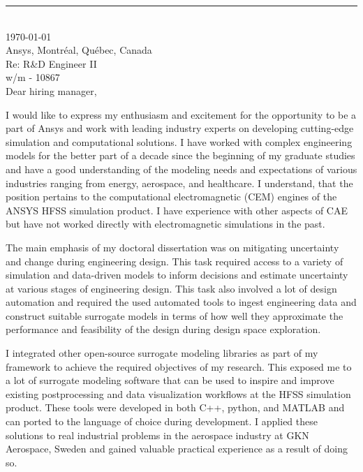 \documentclass[12pt]{article} %
\begin{document}
\medskip %
\rule[0pt]{\textwidth}{1pt}\\
\today\\[6pt]
Ansys, Montr\'{e}al, Qu\'{e}bec, Canada\\
Re: R\&D Engineer II\\
w/m - 10867\\[6pt] \medskip
Dear hiring manager,

\medskip %
I would like to express my enthusiasm and excitement for the opportunity to be a part of Ansys and work with leading industry experts on developing cutting-edge simulation and computational solutions. I have worked with complex engineering models for the better part of a decade since the beginning of my graduate studies and have a good understanding of the modeling needs and expectations of various industries ranging from energy, aerospace, and healthcare. I understand, that the position pertains to the computational electromagnetic (CEM) engines of the ANSYS HFSS simulation product. I have experience with other aspects of CAE but have not worked directly with electromagnetic simulations in the past.

\medskip %

The main emphasis of my doctoral dissertation was on mitigating uncertainty and change during engineering design. This task required access to a variety of simulation and data-driven models to inform decisions and estimate uncertainty at various stages of engineering design. This task also involved a lot of design automation and required the used automated tools to ingest engineering data and construct suitable surrogate models in terms of how well they approximate the performance and feasibility of the design during design space exploration.

\medskip %

I integrated other open-source surrogate modeling libraries as part of my framework to achieve the required objectives of my research. This exposed me to a lot of surrogate modeling software that can be used to inspire and improve existing postprocessing and data visualization workflows at the HFSS simulation product. These tools were developed in both C++, python, and MATLAB and can ported to the language of choice during development. I applied these solutions to real industrial problems in the aerospace industry at GKN Aerospace, Sweden and gained valuable practical experience as a result of doing so.
\end{document}
